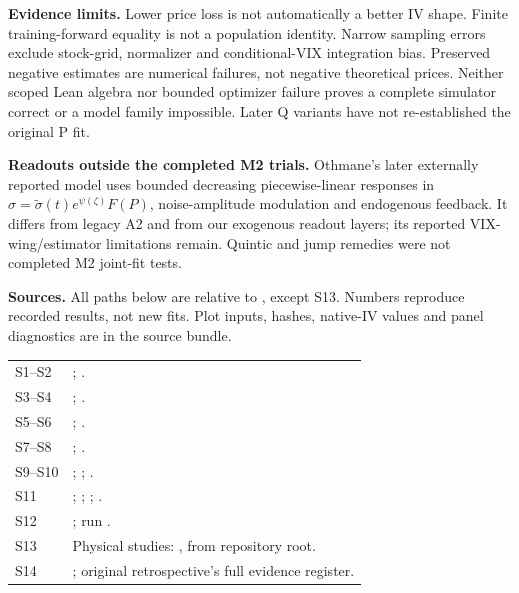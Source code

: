 \documentclass[10pt,a4paper]{article}
\begin{document}
\textbf{Evidence limits.} Lower price loss is not automatically a better IV shape. Finite training-forward equality is not a population identity. Narrow sampling errors exclude stock-grid, normalizer and conditional-VIX integration bias. Preserved negative estimates are numerical failures, not negative theoretical prices. Neither scoped Lean algebra nor bounded optimizer failure proves a complete simulator correct or a model family impossible. Later Q variants have not re-established the original P fit.

\textbf{Readouts outside the completed M2 trials.} Othmane's later externally reported model uses bounded decreasing piecewise-linear responses in $\sigma=\widetilde\sigma(t)e^{\psi(\zeta)}F(P)$, noise-amplitude modulation and endogenous feedback. It differs from legacy A2 and from our exogenous readout layers; its reported VIX-wing/estimator limitations remain. Quintic and jump remedies were not completed M2 joint-fit tests.

\textbf{Sources.} All paths below are relative to , except S13. Numbers reproduce recorded results, not new fits. Plot inputs, hashes, native-IV values and panel diagnostics are in the source bundle.
\footnotesize
\begin{tabularx}{\linewidth}{@{}lY@{}}
S1--S2 & ; .\\
S3--S4 & ; .\\
S5--S6 & ; .\\
S7--S8 & ; .\\
S9--S10 & ; ; .\\
S11 & ; ; ; .\\
S12 & ; run .\\
S13 & Physical studies: , from repository root.\\
S14 & ; original retrospective's full evidence register.\\
\end{tabularx}
\end{document}
